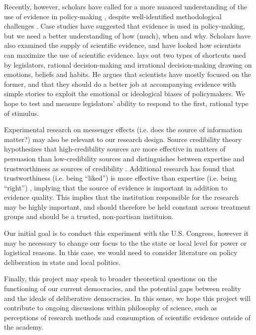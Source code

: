 \documentclass[12pt,final,fleqn]{article}
\theoremstyle{plain}
\begin{document}
Recently, however, scholars have called for a more nuanced understanding of the use of evidence in policy-making \citep{patashnik2016can}, despite well-identified methodological challenges \citep{mandell1984approaches}. Case studies have suggested that evidence is used in policy-making, but we need a better understanding of how (much), when and why. Scholars have also examined the supply of scientific evidence, and have looked how scientists can maximize the use of scientific evidence. \citet{cairney2016politics} lays out two types of shortcuts used by legislators, rational decision-making and irrational decision-making drawing on emotions, beliefs and habits. He argues that scientists have mostly focused on the former, and that they should do a better job at accompanying evidence with simple stories to exploit the emotional or ideological biases of policymakers. We hope to test and measure legislators' ability to respond to the first, rational type of stimulus. 

Experimental research on messenger effects (i.e. does the source of information matter?) may also be relevant to our research design. Source credibility theory hypothesizes that high-credibility sources are more effective in matters of persuasion than low-credibility sources and distinguishes between expertise and trustworthiness as sources of credibility \citep{pornpitakpan2004persuasiveness}. Additional research has found that trustworthiness (i.e. being ``liked'') is more effective than expertise (i.e. being ``right'') \citep{mcginnies1980better}, implying that the source of evidence is important in addition to evidence quality. This implies that the institution responsible for the research may be highly important, and should therefore be held constant across treatment groups and should be a trusted, non-partisan instituion. 

Our initial goal is to conduct this experiment with the U.S. Congress, however it may be necessary to change our focus to the the state or local level for power or logistical reasons. In this case, we would need to consider literature on policy deliberation in state and local politics. 

Finally, this project may speak to broader theoretical questions on the functioning of our current democracies, and the potential gaps between reality and the ideals of deliberative democracies. In this sense, we hope this project will contribute to ongoing discussions within philosophy of science, such as perceptions of research methods and consumption of scientific evidence outside of the academy.
\end{document}
